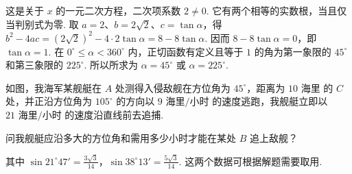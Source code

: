 \begin{solution}
这是关于 \(x\) 的一元二次方程，二次项系数 \(2\neq0\). 它有两个相等的实数根，当且仅当判别式为零. 取 \(a=2\)、\(b=2\sqrt2\)、\(c=\tan\alpha\)，得
\(b^2-4ac=(2\sqrt2)^2-4\cdot2\tan\alpha=8-8\tan\alpha\). 因而
\(8-8\tan\alpha=0\)，即 \(\tan\alpha=1\). 在 \(0^\circ\leqslant\alpha<360^\circ\) 内，正切函数有定义且等于 \(1\) 的角为第一象限的 \(45^\circ\) 和第三象限的 \(225^\circ\). 所以所求为 \(\alpha=45^\circ\) 或 \(\alpha=225^\circ\).
\end{solution}

\begin{problem}
如图，我海军某舰艇在 \(A\) 处测得入侵敌舰在方位角为 \( 45^\circ \)，距离为 \(10\text{ 海里}\) 的 \(C\) 处，并正沿方位角为 \( 105^\circ \) 的方向以 \(9\text{ 海里/小时}\) 的速度逃跑，我舰艇立即以 \(21\text{ 海里/小时}\) 的速度沿直线前去追捕.

问我舰艇应沿多大的方位角和需用多少小时才能在某处 \(B\) 追上敌舰？

其中 \( \sin 21^\circ47'=\frac{3\sqrt{3}}{14} \)，\( \sin 38^\circ13'=\frac{5\sqrt{3}}{14} \).
这两个数据可根据解题需要取用.

\begin{center}
\end{center}
\end{problem}

